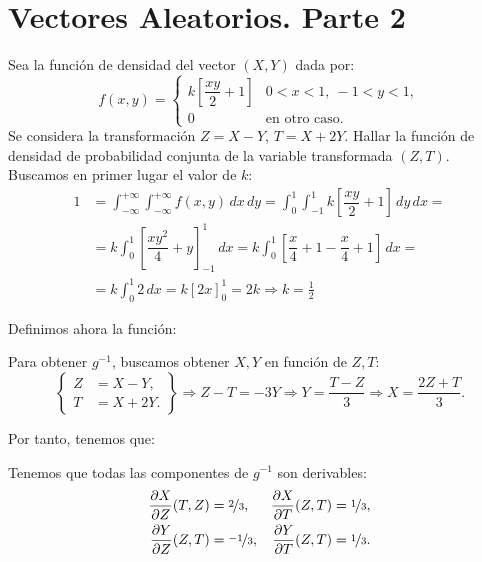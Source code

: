 \section{Vectores Aleatorios. Parte 2}

\begin{ejercicio}
    Sea la función de densidad del vector $(X,Y)$ dada por:
    \begin{equation*}
        f(x, y) = \begin{cases}
            k\left[\dfrac{xy}{2}+1\right] & 0<x<1,~-1<y<1, \\
            0 & \text{en otro caso}.
        \end{cases}
    \end{equation*}
    Se considera la transformación $Z=X-Y$, $T=X+2Y$. Hallar la función de densidad de probabilidad conjunta de la variable transformada $(Z,T)$.\\

    Buscamos en primer lugar el valor de $k$:
    \begin{align*}
        1&=\int_{-\infty}^{+\infty} \int_{-\infty}^{+\infty} f(x, y) \, dx \, dy = \int_{0}^{1} \int_{-1}^{1} k\left[\dfrac{xy}{2}+1\right] \, dy \, dx
        =\\&= k\int_{0}^{1} \left[\dfrac{xy^2}{4}+y\right]_{-1}^{1} \, dx = k\int_{0}^{1} \left[\dfrac{x}{4}+1-\dfrac{x}{4}+1\right] \, dx
        =\\&= k\int_{0}^{1} 2 \, dx = k\left[2x\right]_0^1 = 2k \Longrightarrow k=\frac{1}{2}
    \end{align*}

    Definimos ahora la función:

    Para obtener $g^{-1}$, buscamos obtener $X,Y$ en función de $Z,T$:
    \begin{equation*}
        \left\{\begin{aligned}
            Z&=X-Y, \\
            T&=X+2Y.
        \end{aligned}\right\}\Longrightarrow
        Z-T=-3Y\Longrightarrow Y=\dfrac{T-Z}{3}\Longrightarrow X=\dfrac{2Z+T}{3}.
    \end{equation*}

    Por tanto, tenemos que:

    Tenemos que todas las componentes de $g^{-1}$ son derivables:
    \begin{align*}
        \dfrac{\partial X}{\partial Z}(T,Z)&=\nicefrac{2}{3}, & \dfrac{\partial X}{\partial T}(Z,T)&=\nicefrac{1}{3},\\
        \dfrac{\partial Y}{\partial Z}(Z,T)&=\nicefrac{-1}{3}, & \dfrac{\partial Y}{\partial T}(Z,T)&=\nicefrac{1}{3}.
    \end{align*}


\end{ejercicio}
